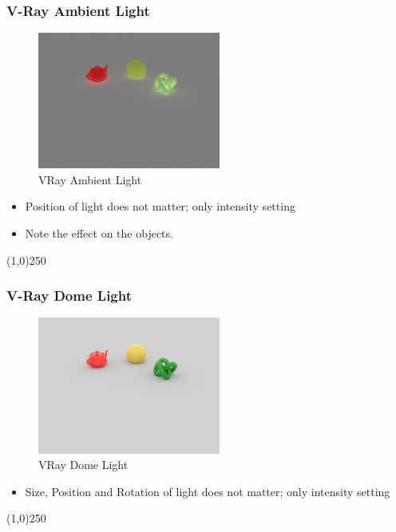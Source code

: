 \begin{frame}
	\frametitle{V-Ray Ambient Light}
	\begin{figure}
		\centering
		\includegraphics[height=4.5cm]{./Lights/Ambient}
		\caption{VRay Ambient Light}
		\label{fig:AmbientLight}
	\end{figure}
	\begin{itemize}
		\item Position of light does not matter; only intensity setting
		\item Note the effect on the objects.
	\end{itemize}
\end{frame}
\begin{center}\line(1,0){250}\end{center}



\begin{frame}
	\frametitle{V-Ray Dome Light}
	\begin{figure}
		\centering
		\includegraphics[height=4.5cm]{./Lights/DomeLight}
		\caption{VRay Dome Light}
		\label{fig:DomeLight}
	\end{figure}
	\begin{itemize}
		\item Size, Position and Rotation of light does not matter; only intensity setting
	\end{itemize}
\end{frame}
\begin{center}\line(1,0){250}\end{center}





